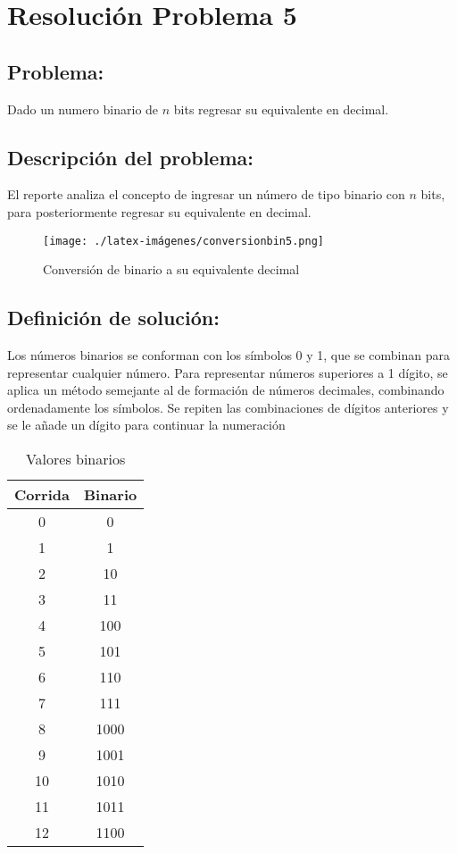 \section{Resolución Problema 5}
\subsection{Problema:}
Dado un numero binario de $n$ bits regresar su equivalente en decimal.

\subsection{\textbf{Descripción del problema:}}

El reporte analiza el concepto de ingresar un número de tipo binario con $n$ bits, para posteriormente regresar su equivalente en decimal.

\begin{figure}[h!]
    \centering
    \texttt{[image: ./latex-imágenes/conversionbin5.png]}
    \caption{Conversión de binario a su equivalente decimal}
    \label{fig:GraficaEcuacionRecta}
\end{figure}

\subsection{\textbf{Definición de solución:}}

Los números binarios se conforman con los símbolos 0 y 1, que se combinan para representar cualquier número. 
Para representar números superiores a 1 dígito, se aplica un método semejante al de formación de números decimales, combinando ordenadamente los símbolos. Se repiten las combinaciones de dígitos anteriores y se le añade un dígito para continuar la numeración

\begin{table}[h]
     \centering
     \caption{Valores binarios}
     
     \begin{tabular}{|c|c|}
     \hline
        Corrida & Binario \\
        \hline
        0  & 0 \\
        \hline
        1  & 1 \\
        \hline
        2  & 10 \\
        \hline
        3  & 11 \\
        \hline
        4  & 100 \\
        \hline
        5  & 101 \\
        \hline
        6  & 110 \\
        \hline
        7  & 111 \\
        \hline
        8  & 1000 \\
        \hline
        9  & 1001 \\
        \hline
        10  & 1010 \\
        \hline
        11  & 1011 \\
        \hline
        12  & 1100 \\
        \hline
     \end{tabular}
     \label{tab:my_label}
 \end{table}

